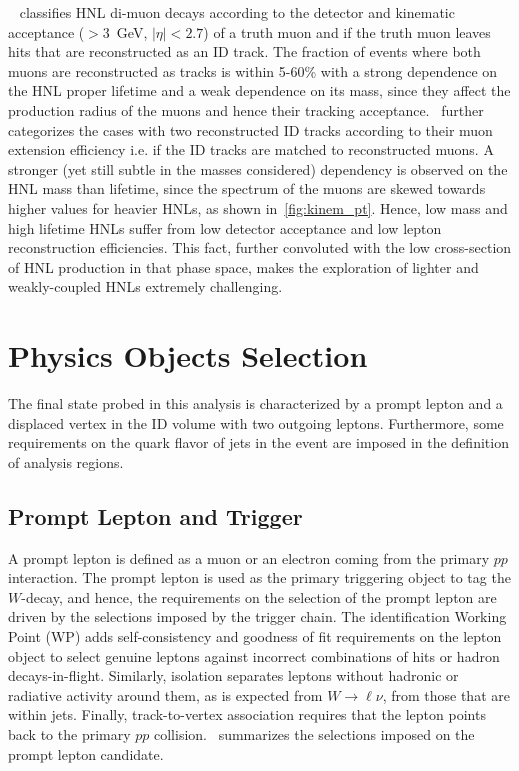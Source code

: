 ~ classifies HNL di-muon decays according to the detector and kinematic acceptance (\pT$>3$~GeV, $|\eta|<2.7$) of a truth muon and if the truth muon leaves hits that are reconstructed as an ID track. The fraction of events where both muons are reconstructed as tracks is within 5-60\% with a strong dependence on the HNL proper lifetime and a weak dependence on its mass, since they affect the production radius of the muons and hence their tracking acceptance.~ further categorizes the cases with two reconstructed ID tracks according to their muon extension efficiency i.e. if the ID tracks are matched to reconstructed muons. A stronger (yet still subtle in the masses considered) dependency is observed on the HNL mass than lifetime, since the \pT spectrum of the muons are skewed towards higher values for heavier HNLs, as shown in~\cref{fig:kinem_pt}. Hence, low mass and high lifetime HNLs suffer from low detector acceptance and low lepton reconstruction efficiencies. This fact, further convoluted with the low cross-section of HNL production in that phase space, makes the exploration of lighter and weakly-coupled HNLs extremely challenging.

\section{Physics Objects Selection}\label{sec:object_sel}
The final state probed in this analysis is characterized by a prompt lepton and a displaced vertex in the ID volume with two outgoing leptons. Furthermore, some requirements on the quark flavor of jets in the event are imposed in the definition of analysis regions.

\subsection{Prompt Lepton and Trigger}
A prompt lepton is defined as a muon or an electron coming from the primary $pp$ interaction. The prompt lepton is used as the primary triggering object to tag the $W$-decay, and hence, the requirements on the selection of the prompt lepton are driven by the selections imposed by the trigger chain. The identification Working Point (WP) adds self-consistency and goodness of fit requirements on the lepton object to select genuine leptons against incorrect combinations of hits or hadron decays-in-flight. Similarly, isolation separates leptons without hadronic or radiative activity around them, as is expected from $W\to\ell\nu$, from those that are within jets. Finally, track-to-vertex association requires that the lepton points back to the primary $pp$ collision.~ summarizes the selections imposed on the prompt lepton candidate.

